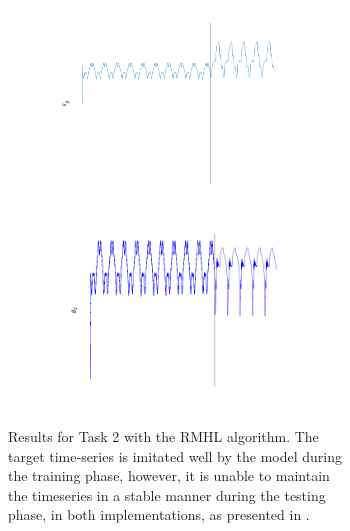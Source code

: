 \begin{figure}
\begin{subfigure}{\textwidth}
\begin{subfigure}{\textwidth}
        \end{subfigure}
         
        
        \textbf{}\begin{subfigure}{\textwidth}
        \centering
        
        \includegraphics[trim=2cm 0cm 0cm 0cm, clip=true,height=0.1\linewidth,width=.45\linewidth]{Figures/MATLAB/RMHL_T2_Seg2_Theta2.png}
        \includegraphics[trim=2cm 0cm 0cm 0cm, clip=true,height=0.1\linewidth,width=.45\linewidth]{Figures/Python/RMHL_T2_Seg2_Theta2.png}
        
        \end{subfigure}
        
    \caption{Results for Task 2 with the RMHL algorithm. The target time‐series is imitated well by the model during the training phase, however, it is unable to maintain the timeseries in a stable manner during the testing phase, in both implementations, as presented in \cite{pyle2019}.}
    \label{Fig:compTask2RMHL}
    \end{subfigure}
    
    \begin{subfigure}{\textwidth}
        \centering
        
        \textbf{}\begin{subfigure}{\textwidth}
        \centering
        

\end{subfigure}
\end{subfigure}
\end{figure}
